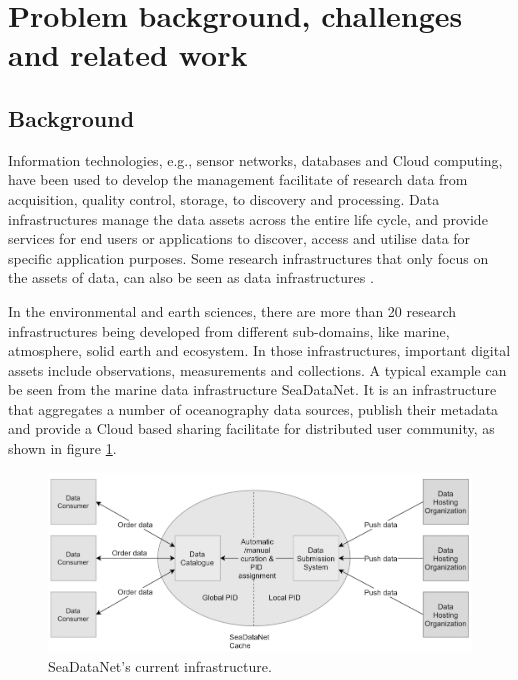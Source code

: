 \documentclass[conference]{IEEEtran}
\begin{document}

\section{Problem background, challenges and related work}
\subsection{Background}
Information technologies, e.g., sensor networks, databases and Cloud computing, have been used to develop the management facilitate of research data from acquisition, quality control, storage, to discovery and processing. Data infrastructures \cite{} manage the data assets across the entire life cycle, and provide services for end users or applications to discover, access and utilise data for specific application purposes. Some research infrastructures that only focus on the assets of data, can also be seen as data infrastructures \cite{}. 

In the environmental and earth sciences, there are more than 20 research infrastructures being developed from different sub-domains, like marine, atmosphere, solid earth and ecosystem. In those infrastructures, important digital assets include observations, measurements and collections. A typical example can be seen from the marine data infrastructure SeaDataNet. It is an infrastructure that aggregates a number of oceanography data sources, publish their metadata and provide a Cloud based sharing facilitate for distributed user community, as shown in figure \ref{fig:sdc_cur}. 
\begin{figure}[H]
\centering
\includegraphics[width=\columnwidth]{images/SDC_current.png}
\caption{SeaDataNet's current infrastructure.}
\label{fig:sdc_cur}
\end{figure}
\end{document}
